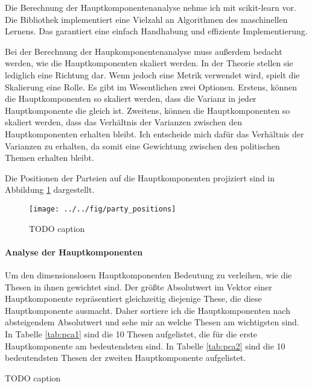 Die Berechnung der Hauptkomponentenanalyse nehme ich mit scikit-learn \citep{scikit-learn} vor. Die Bibliothek implementiert eine Vielzahl an Algorithmen des maschinellen Lernens. Das garantiert eine einfach Handhabung und effiziente Implementierung.

Bei der Berechnung der Haupkomponentenanalyse muss außerdem bedacht werden, wie die Hauptkomponenten skaliert werden. In der Theorie stellen sie lediglich eine Richtung dar. Wenn jedoch eine Metrik verwendet wird, spielt die Skalierung eine Rolle. Es gibt im Wesentlichen zwei Optionen. Erstens, können die Hauptkomponenten so skaliert werden, dass die Varianz in jeder Hauptkomponente die gleich ist. Zweitens, können die Hauptkomponenten so skaliert werden, dass das Verhältnis der Varianzen zwischen den Hauptkomponenten erhalten bleibt. Ich entscheide mich dafür das Verhältnis der Varianzen zu erhalten, da somit eine Gewichtung zwischen den politischen Themen erhalten bleibt.

Die Positionen der Parteien auf die Hauptkomponenten projiziert sind in Abbildung \ref{fig:party-positions-pca} dargestellt.

\begin{figure}[htb]
	\centering
	\texttt{[image: ../../fig/party\_positions]}
	\caption{TODO caption}
	\label{fig:party-positions-pca}
\end{figure}

\paragraph{Analyse der Hauptkomponenten}
Um den dimensionslosen Hauptkomponenten Bedeutung zu verleihen, wie die Thesen in ihnen gewichtet sind. Der größte Absolutwert im Vektor einer Hauptkomponente repräsentiert gleichzeitig diejenige These, die diese Hauptkomponente ausmacht. Daher sortiere ich die Hauptkomponenten nach absteigendem Absolutwert und sehe mir an welche Thesen am wichtigsten sind.
In Tabelle \ref{tab:pca1} sind die 10 Thesen aufgelistet, die für die erste Hauptkomponente am bedeutendsten sind. In Tabelle \ref{tab:pca2} sind die 10 bedeutendsten Thesen der zweiten Hauptkomponente aufgelistet.

\begin{table}[htb]
	\centering
	\caption{TODO caption}
	\label{tab:pca1}
\end{table}

